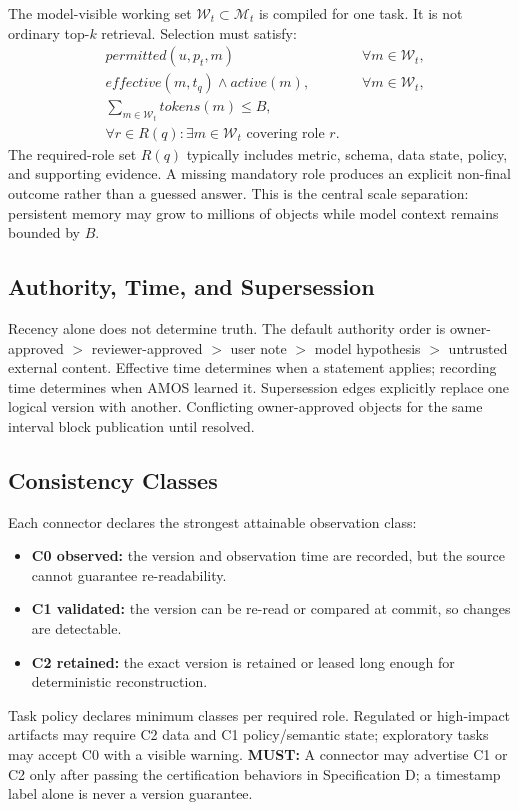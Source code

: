 \documentclass[10pt]{article}
\newcommand{\amos}{\textsc{AMOS}\xspace}
\newcommand{\must}{\textbf{\textcolor{amosblue}{MUST:}}\xspace}
\newcommand{\mem}{\mathcal{M}}
\newcommand{\work}{\mathcal{W}}
\begin{document}
The model-visible working set $\work_t \subset \mem_t$ is compiled for one task. It is not ordinary top-$k$ retrieval. Selection must satisfy:
\begin{align}
  & permitted(u, p_t, m) && \forall m \in \work_t, \\
  & effective(m, t_q) \land active(m), && \forall m \in \work_t, \\
  & \sum_{m \in \work_t} tokens(m) \leq B, \\
  & \forall r \in R(q): \exists m \in \work_t \text{ covering role } r.
\end{align}
The required-role set $R(q)$ typically includes metric, schema, data state, policy, and supporting evidence. A missing mandatory role produces an explicit non-final outcome rather than a guessed answer. This is the central scale separation: persistent memory may grow to millions of objects while model context remains bounded by $B$.

\subsection{Authority, Time, and Supersession}

Recency alone does not determine truth. The default authority order is owner-approved $>$ reviewer-approved $>$ user note $>$ model hypothesis $>$ untrusted external content. Effective time determines when a statement applies; recording time determines when \amos learned it. Supersession edges explicitly replace one logical version with another. Conflicting owner-approved objects for the same interval block publication until resolved.

\subsection{Consistency Classes}

Each connector declares the strongest attainable observation class:
\begin{itemize}
  \item \textbf{C0 observed:} the version and observation time are recorded, but the source cannot guarantee re-readability.
  \item \textbf{C1 validated:} the version can be re-read or compared at commit, so changes are detectable.
  \item \textbf{C2 retained:} the exact version is retained or leased long enough for deterministic reconstruction.
\end{itemize}
Task policy declares minimum classes per required role. Regulated or high-impact artifacts may require C2 data and C1 policy/semantic state; exploratory tasks may accept C0 with a visible warning. \must A connector may advertise C1 or C2 only after passing the certification behaviors in Specification D; a timestamp label alone is never a version guarantee.
\end{document}
